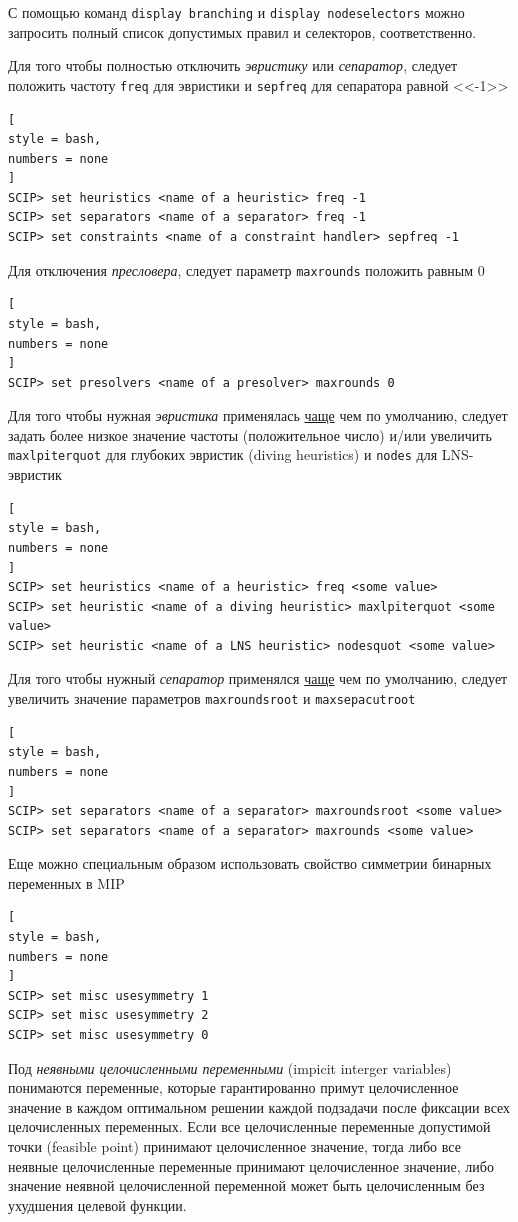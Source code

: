 \documentclass[%
	11pt,
	a4paper,
	utf8,
		]{article}
\begin{document}
С помощью команд \verb|display branching| и \verb|display nodeselectors| можно запросить полный список допустимых правил и селекторов, соответственно.

Для того чтобы полностью отключить \emph{эвристику} или \emph{сепаратор}, следует положить частоту \verb|freq| для эвристики и \verb|sepfreq| для сепаратора равной <<-1>>
\begin{lstlisting}[
style = bash,
numbers = none
]
SCIP> set heuristics <name of a heuristic> freq -1
SCIP> set separators <name of a separator> freq -1
SCIP> set constraints <name of a constraint handler> sepfreq -1
\end{lstlisting}

Для отключения \emph{пресловера}, следует параметр \verb|maxrounds| положить равным 0
\begin{lstlisting}[
style = bash,
numbers = none
]
SCIP> set presolvers <name of a presolver> maxrounds 0
\end{lstlisting}

Для того чтобы нужная \emph{эвристика} применялась \underline{чаще} чем по умолчанию, следует задать более низкое значение частоты (положительное число) и/или увеличить \verb|maxlpiterquot| для глубоких эвристик (diving heuristics) и \verb|nodes| для LNS-эвристик
\begin{lstlisting}[
style = bash,
numbers = none
]
SCIP> set heuristics <name of a heuristic> freq <some value>
SCIP> set heuristic <name of a diving heuristic> maxlpiterquot <some value>
SCIP> set heuristic <name of a LNS heuristic> nodesquot <some value>
\end{lstlisting}

Для того чтобы нужный \emph{сепаратор} применялся \underline{чаще} чем по умолчанию, следует увеличить значение параметров \verb|maxroundsroot| и \verb|maxsepacutroot|
\begin{lstlisting}[
style = bash,
numbers = none
]
SCIP> set separators <name of a separator> maxroundsroot <some value>
SCIP> set separators <name of a separator> maxrounds <some value>
\end{lstlisting}

Еще можно специальным образом использовать свойство симметрии бинарных переменных в MIP
\begin{lstlisting}[
style = bash,
numbers = none
]
SCIP> set misc usesymmetry 1
SCIP> set misc usesymmetry 2
SCIP> set misc usesymmetry 0
\end{lstlisting}

Под \emph{неявными целочисленными переменными} (impicit interger variables) понимаются переменные, которые гарантированно примут целочисленное значение в каждом оптимальном решении каждой подзадачи после фиксации всех целочисленных переменных. Если все целочисленные переменные допустимой точки (feasible point) принимают целочисленное значение, тогда либо все неявные целочисленные переменные принимают целочисленное значение, либо значение неявной целочисленной переменной может быть целочисленным без ухудшения целевой функции.
\end{document}
